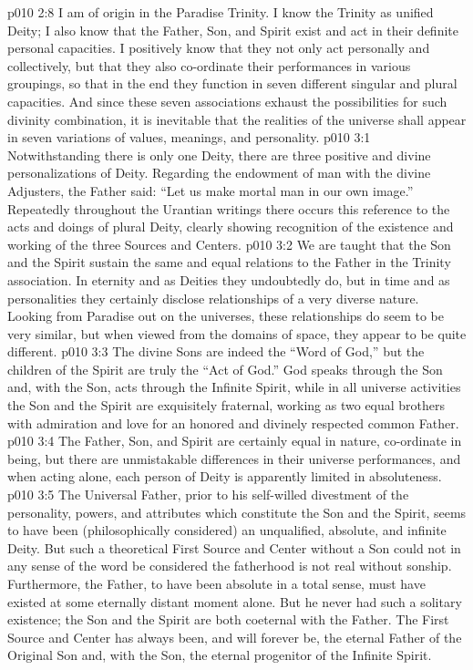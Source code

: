 \vs p010 2:8 I am of origin in the Paradise Trinity. I know the Trinity as unified Deity; I also know that the Father, Son, and Spirit exist and act in their definite personal capacities. I positively know that they not only act personally and collectively, but that they also co\hyp{}ordinate their performances in various groupings, so that in the end they function in seven different singular and plural capacities. And since these seven associations exhaust the possibilities for such divinity combination, it is inevitable that the realities of the universe shall appear in seven variations of values, meanings, and personality.
\vs p010 3:1 Notwithstanding there is only one Deity, there are three positive and divine personalizations of Deity. Regarding the endowment of man with the divine Adjusters, the Father said: “Let us make mortal man in our own image.” Repeatedly throughout the Urantian writings there occurs this reference to the acts and doings of plural Deity, clearly showing recognition of the existence and working of the three Sources and Centers.
\vs p010 3:2 \pc We are taught that the Son and the Spirit sustain the same and equal relations to the Father in the Trinity association. In eternity and as Deities they undoubtedly do, but in time and as personalities they certainly disclose relationships of a very diverse nature. Looking from Paradise out on the universes, these relationships do seem to be very similar, but when viewed from the domains of space, they appear to be quite different.
\vs p010 3:3 The divine Sons are indeed the “Word of God,” but the children of the Spirit are truly the “Act of God.” God speaks through the Son and, with the Son, acts through the Infinite Spirit, while in all universe activities the Son and the Spirit are exquisitely fraternal, working as two equal brothers with admiration and love for an honored and divinely respected common Father.
\vs p010 3:4 The Father, Son, and Spirit are certainly equal in nature, co\hyp{}ordinate in being, but there are unmistakable differences in their universe performances, and when acting alone, each person of Deity is apparently limited in absoluteness.
\vs p010 3:5 \pc The Universal Father, prior to his self\hyp{}willed divestment of the personality, powers, and attributes which constitute the Son and the Spirit, seems to have been (philosophically considered) an unqualified, absolute, and infinite Deity. But such a theoretical First Source and Center without a Son could not in any sense of the word be considered the  fatherhood is not real without sonship. Furthermore, the Father, to have been absolute in a total sense, must have existed at some eternally distant moment alone. But he never had such a solitary existence; the Son and the Spirit are both coeternal with the Father. The First Source and Center has always been, and will forever be, the eternal Father of the Original Son and, with the Son, the eternal progenitor of the Infinite Spirit.
